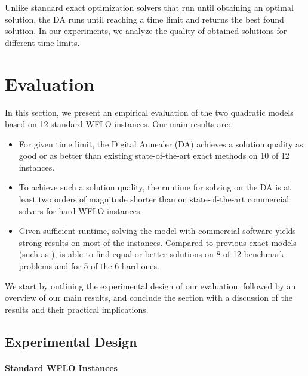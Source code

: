 \documentclass[preprint,12pt]{elsarticle}
\newcommand{\todo}[1]{{\textcolor{red}{\bf {#1}}}}
\newcommand{\qcls}{{\sf {\small QC-LS\xspace}}}
\newcommand{\quls}{{\sf {\small QU-LS\xspace}}}
\newcommand{\qcss}{{\sf {\small QC-SS\xspace}}}
\newcommand{\qcssgrb}{{\sf {\small QC-SS(GRB)\xspace}}}
\begin{document}
Unlike %
standard exact optimization solvers that run until obtaining an optimal solution, the DA runs until reaching a time limit and returns the best found solution.  In our experiments, we analyze the quality of obtained solutions for different time limits.


\section{Evaluation}
\label{sec:eval}

In this section, we 
present an empirical evaluation of the two quadratic models based on 
12 standard WFLO instances.
Our main results are: \begin{itemize}
	\item For given time limit, the Digital Annealer (DA) achieves a solution quality as good or as better than existing state-of-the-art exact methods on 10 of 12 instances.
		\item To achieve such a solution quality, the runtime for solving \quls{} on the DA is at least two orders of magnitude shorter than \qcls{} on state-of-the-art commercial solvers for hard WFLO instances.  
	\item Given sufficient runtime, solving the \qcls{} model with commercial software yields strong results on most of the instances. Compared to previous exact models (such as \qcss), \qcls{} is able to find equal or better solutions on 8 of 12 benchmark problems and for 5 of the 6 hard ones. %
\end{itemize}

We start by outlining the experimental design of our evaluation, followed by an overview of our main results,
and conclude the section with a discussion of the results and their practical implications.

\subsection{Experimental Design}



\paragraph{Standard WFLO Instances}
\end{document}
